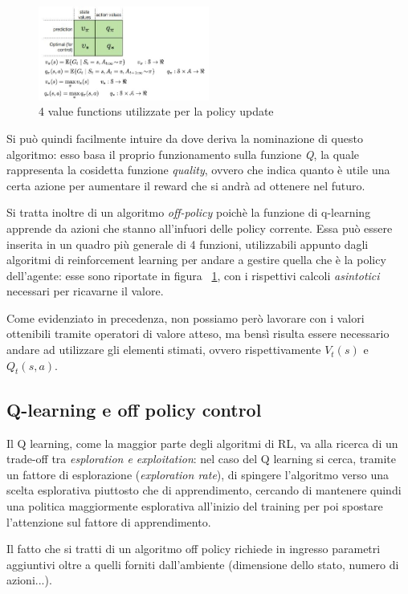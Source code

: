 \begin{figure}[!h]
	\centering
	\includegraphics[width=0.5\textwidth]{Immagini/4_valueFunctions.JPG}
	\caption{4 value functions utilizzate per la policy update}
	\label{fig:ValueFunctions}
\end{figure}

Si può quindi facilmente intuire da dove deriva la nominazione di questo algoritmo: esso basa il proprio funzionamento sulla funzione \textit{Q}, la quale rappresenta la cosidetta funzione \textit{quality}, ovvero che indica quanto è utile una certa azione per aumentare il reward che si andrà ad ottenere nel futuro. 

Si tratta inoltre di un algoritmo \textit{off-policy} poichè la funzione di q-learning apprende da azioni che stanno all'infuori delle policy corrente.
Essa può essere inserita in un quadro più generale di 4 funzioni, utilizzabili appunto dagli algoritmi di reinforcement learning per andare a gestire quella che è la policy dell'agente: esse sono riportate in figura ~\ref{fig:ValueFunctions}, con i rispettivi calcoli \textit{asintotici} necessari per ricavarne il valore.

Come evidenziato in precedenza, non possiamo però lavorare con i valori ottenibili tramite operatori di valore atteso, ma bensì risulta essere necessario andare ad utilizzare gli elementi stimati, ovvero rispettivamente $V_t(s)$ e $Q_t(s,a)$.

\subsection{Q-learning e off policy control}
Il Q learning, come la maggior parte degli algoritmi di RL, va alla ricerca di un trade-off tra \textit{esploration e exploitation}: nel caso del Q learning si cerca, tramite un fattore di esplorazione (\textit{exploration rate}), di spingere l'algoritmo verso una scelta esplorativa piuttosto che di apprendimento, cercando di mantenere quindi una politica maggiormente esplorativa all'inizio del training per poi spostare l'attenzione sul fattore di apprendimento.

Il fatto che si tratti di un algoritmo off policy richiede in ingresso parametri aggiuntivi oltre a quelli forniti dall'ambiente (dimensione dello stato, numero di azioni...).

